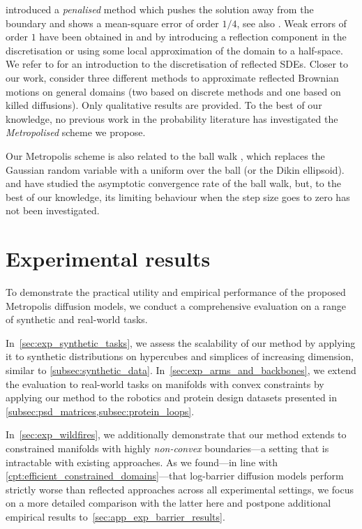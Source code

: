 \textcite{liu1993numerical} introduced a \emph{penalised}
method which pushes the solution away from the boundary and shows a mean-square error
of order \(1/4\), see also \cite{pettersson1997penalization}.
Weak errors of order \(1\) have been obtained in \textcite{bossy2004symmetrized} and \textcite{gobet2001euler} by introducing a reflection component in the discretisation or using some local approximation of the domain to a half-space.
We refer to \textcite{pilipenko2014introduction} for an introduction to the discretisation of reflected SDEs.
Closer to our work, \textcite{burdzy2008discrete} consider three different methods to approximate reflected Brownian motions on general domains (two based on discrete methods and one based on killed diffusions).
Only qualitative results are provided.
To the best of our knowledge, no previous work in the probability literature has investigated the \emph{Metropolised} scheme we propose.

Our Metropolis scheme is also related to the ball walk \parencite{applegate1991sampling}, which replaces the Gaussian random variable with a uniform over the ball (or the Dikin ellipsoid).
\textcite{applegate1991sampling} and \textcite{lovasz2007geometry} have
studied the asymptotic convergence rate of the ball walk, but, to the best of our
knowledge, its limiting behaviour when the step size goes to zero has not been
investigated.

\section{Experimental results}

To demonstrate the practical utility and empirical performance of the proposed Metropolis diffusion models, we conduct a comprehensive evaluation on a range of synthetic and real-world tasks.

In~\cref{sec:exp_synthetic_tasks}, we assess the scalability of our method by applying it to synthetic distributions on hypercubes and simplices of increasing dimension, similar to \cref{subsec:synthetic_data}.
In~\cref{sec:exp_arms_and_backbones}, we extend the evaluation to real-world tasks on manifolds with convex constraints by applying our method to the robotics and protein design datasets presented in \cref{subsec:psd_matrices,subsec:protein_loops}.

In~\cref{sec:exp_wildfires}, we additionally demonstrate that our method extends to constrained manifolds with highly \emph{non-convex} boundaries---a setting that is intractable with existing approaches.
As we found---in line with \cref{cpt:efficient_constrained_domains}---that log-barrier diffusion models perform strictly worse than reflected approaches across all experimental settings, we focus on a more detailed comparison with the latter here and postpone additional empirical results to~\cref{sec:app_exp_barrier_results}.

